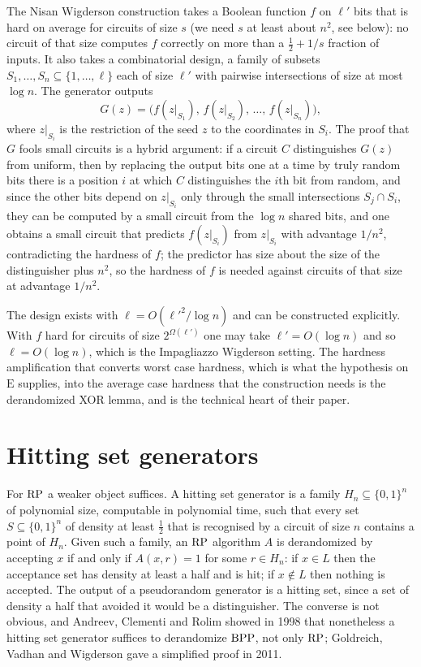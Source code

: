 The Nisan Wigderson construction takes a Boolean function $f$ on $\ell'$ bits that is hard on average for circuits of size $s$ (we need $s$ at least about $n^2$, see below): no circuit of that size computes $f$ correctly on more than a $\tfrac12 + 1/s$ fraction of inputs. It also takes a combinatorial design, a family of subsets $S_1, \dots, S_n \subseteq \{1, \dots, \ell\}$ each of size $\ell'$ with pairwise intersections of size at most $\log n$. The generator outputs
\[
G(z) = \big( f(z|_{S_1}), \, f(z|_{S_2}), \, \dots, \, f(z|_{S_n}) \big) ,
\]
where $z|_{S_i}$ is the restriction of the seed $z$ to the coordinates in $S_i$. The proof that $G$ fools small circuits is a hybrid argument: if a circuit $C$ distinguishes $G(z)$ from uniform, then by replacing the output bits one at a time by truly random bits there is a position $i$ at which $C$ distinguishes the $i$th bit from random, and since the other bits depend on $z|_{S_i}$ only through the small intersections $S_j \cap S_i$, they can be computed by a small circuit from the $\log n$ shared bits, and one obtains a small circuit that predicts $f(z|_{S_i})$ from $z|_{S_i}$ with advantage $1/n^2$, contradicting the hardness of $f$; the predictor has size about the size of the distinguisher plus $n^2$, so the hardness of $f$ is needed against circuits of that size at advantage $1/n^2$.

The design exists with $\ell = O(\ell'^2 / \log n)$ and can be constructed explicitly. With $f$ hard for circuits of size $2^{\Omega(\ell')}$ one may take $\ell' = O(\log n)$ and so $\ell = O(\log n)$, which is the Impagliazzo Wigderson setting. The hardness amplification that converts worst case hardness, which is what the hypothesis on $\mathrm{E}$ supplies, into the average case hardness that the construction needs is the derandomized XOR lemma, and is the technical heart of their paper.

\section{Hitting set generators}

For $\mathrm{RP}$ a weaker object suffices. A hitting set generator is a family $H_n \subseteq \{0,1\}^n$ of polynomial size, computable in polynomial time, such that every set $S \subseteq \{0,1\}^n$ of density at least $\tfrac12$ that is recognised by a circuit of size $n$ contains a point of $H_n$. Given such a family, an $\mathrm{RP}$ algorithm $A$ is derandomized by accepting $x$ if and only if $A(x, r) = 1$ for some $r \in H_n$: if $x \in L$ then the acceptance set has density at least a half and is hit; if $x \notin L$ then nothing is accepted. The output of a pseudorandom generator is a hitting set, since a set of density a half that avoided it would be a distinguisher. The converse is not obvious, and Andreev, Clementi and Rolim showed in 1998 that nonetheless a hitting set generator suffices to derandomize $\mathrm{BPP}$, not only $\mathrm{RP}$; Goldreich, Vadhan and Wigderson gave a simplified proof in 2011.

